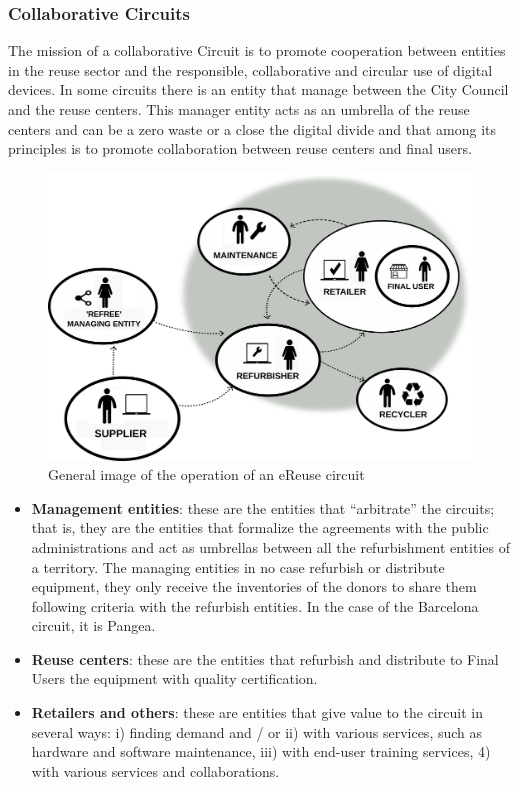 \documentclass[
]{book}
\begin{document}
\hypertarget{collaborative-circuits}{%
\subsubsection{Collaborative Circuits}\label{collaborative-circuits}}

The mission of a collaborative Circuit is to promote cooperation between entities in the reuse sector and the responsible, collaborative and circular use of digital devices. In some circuits there is an entity that manage between the City Council and the reuse centers. This manager entity acts as an umbrella of the reuse centers and can be a zero waste or a close the digital divide and that among its principles is to promote collaboration between reuse centers and final users.

\begin{figure}

{\centering \includegraphics[width=1\linewidth]{./figs/3} 

}

\caption{General image of the operation of an eReuse circuit}\label{fig:figparticipants}
\end{figure}

\begin{itemize}
\item
  \textbf{Management entities}: these are the entities that ``arbitrate'' the circuits; that is, they are the entities that formalize the agreements with the public administrations and act as umbrellas between all the refurbishment entities of a territory. The managing entities in no case refurbish or distribute equipment, they only receive the inventories of the donors to share them following criteria with the refurbish entities. In the case of the Barcelona circuit, it is Pangea.
\item
  \textbf{Reuse centers}: these are the entities that refurbish and distribute to Final Users the equipment with quality certification.
\item
  \textbf{Retailers and others}: these are entities that give value to the circuit in several ways: i) finding demand and / or ii) with various services, such as hardware and software maintenance, iii) with end-user training services, 4) with various services and collaborations.
\end{itemize}
\end{document}

